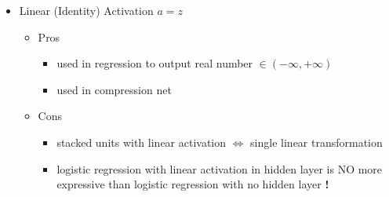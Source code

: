 \begin{itemize}
\item Linear (Identity) Activation $a=z$
	\begin{itemize}
	\item Pros
		\begin{itemize}
		\item used in regression to output real number $\in (-\infty, +\infty)$
		\item used in compression net
		\end{itemize}
	\item Cons
		\begin{itemize}
		\item stacked units with linear activation $\Leftrightarrow$ single linear transformation
		\item logistic regression with linear activation in hidden layer is NO more expressive than logistic regression with no hidden layer \textbf{!}
		\end{itemize}
	\end{itemize}
\end{itemize}

